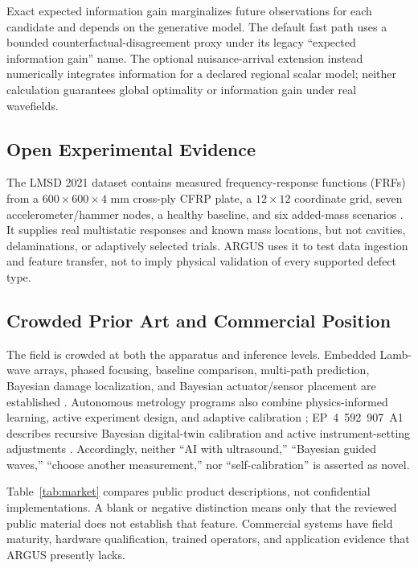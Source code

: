 \documentclass[conference]{IEEEtran}
\begin{document}
Exact expected information gain marginalizes future observations for each candidate and depends on the generative model. The default fast path uses a bounded counterfactual-disagreement proxy under its legacy ``expected information gain'' name. The optional nuisance-arrival extension instead numerically integrates information for a declared regional scalar model; neither calculation guarantees global optimality or information gain under real wavefields.

\subsection{Open Experimental Evidence}
The LMSD 2021 dataset contains measured frequency-response functions (FRFs) from a $600\times600\times4$ mm cross-ply CFRP plate, a $12\times12$ coordinate grid, seven accelerometer/hammer nodes, a healthy baseline, and six added-mass scenarios \cite{dwek2024dataset}. It supplies real multistatic responses and known mass locations, but not cavities, delaminations, or adaptively selected trials. ARGUS uses it to test data ingestion and feature transfer, not to imply physical validation of every supported defect type.

\subsection{Crowded Prior Art and Commercial Position}
The field is crowded at both the apparatus and inference levels. Embedded Lamb-wave arrays, phased focusing, baseline comparison, multi-path prediction, Bayesian damage localization, and Bayesian actuator/sensor placement are established \cite{giurgiutiu2005patent,hall2018patent,boeing2025patent,flynn2010,cantero2019}. Autonomous metrology programs also combine physics-informed learning, active experiment design, and adaptive calibration \cite{nist2025sams}; EP~4~592~907~A1 describes recursive Bayesian digital-twin calibration and active instrument-setting adjustments \cite{fei2025patent}. Accordingly, neither ``AI with ultrasound,'' ``Bayesian guided waves,'' ``choose another measurement,'' nor ``self-calibration'' is asserted as novel.

Table~\ref{tab:market} compares public product descriptions, not confidential implementations. A blank or negative distinction means only that the reviewed public material does not establish that feature. Commercial systems have field maturity, hardware qualification, trained operators, and application evidence that ARGUS presently lacks.
\end{document}
